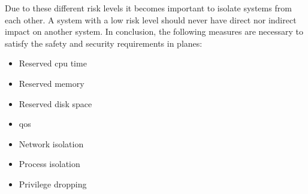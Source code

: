 \documentclass[titlepage]{report}
\begin{document}
Due to these different risk levels it becomes important to isolate systems from each other. A system
with a low risk level should never have direct nor indirect impact on another system. In conclusion,
the following measures are necessary to satisfy the safety and security requirements in planes:

\begin{itemize}
    \item Reserved \gls{cpu} time
    \item Reserved memory
    \item Reserved disk space
    \item \gls{qos}
    \item Network isolation
    \item Process isolation
    \item Privilege dropping
\end{itemize}
\end{document}
